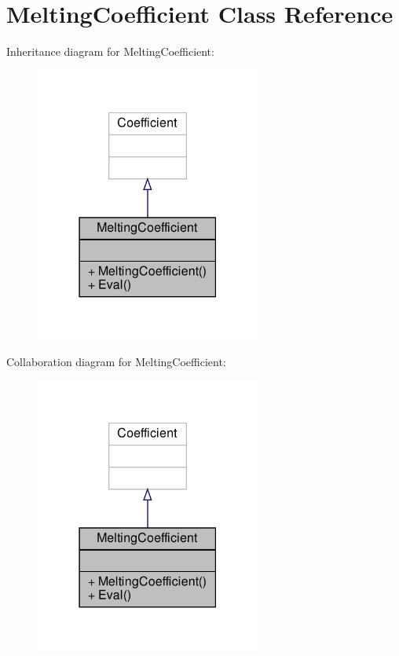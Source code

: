 \hypertarget{classMeltingCoefficient}{}\section{Melting\+Coefficient Class Reference}
\label{classMeltingCoefficient}


Inheritance diagram for Melting\+Coefficient\+:\nopagebreak
\begin{figure}[H]
\begin{center}
\leavevmode
\includegraphics[width=210pt]{classMeltingCoefficient__inherit__graph}
\end{center}
\end{figure}


Collaboration diagram for Melting\+Coefficient\+:\nopagebreak
\begin{figure}[H]
\begin{center}
\leavevmode
\includegraphics[width=210pt]{classMeltingCoefficient__coll__graph}
\end{center}
\end{figure}
